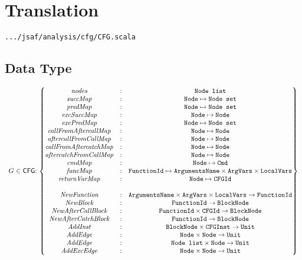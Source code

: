 \section{Translation}
{\inblue\tt .../jsaf/analysis/cfg/CFG.scala}
\subsection{Data Type}
\[
\begin{array}{r@{~}l@{~}l@{}l@{~}l}
G&\in&\CFG & : &
	\begin{Bmatrix}
	\emph{nodes} &:&\Nodelist\\ 
	\emph{succMap} &:&\Node \mapsto\Nodeset\\
	\emph{predMap} &:&\Node \mapsto\Nodeset\\
	\emph{excSuccMap} &:&\Node \mapsto\Node\\
	\emph{excPredMap} &:&\Node \mapsto\Nodeset\\
	\emph{callFromAftercallMap} &:&\Node \mapsto \Node\\
	\emph{aftercallFromCallMap} &:&\Node \mapsto \Node\\
	\emph{callFromAftercatchMap} &:&\Node \mapsto \Node\\
	\emph{aftercatchFromCallMap} &:&\Node \mapsto \Node\\
	\emph{cmdMap} &:& \Node \mapsto \TT{Cmd}\\
	\emph{funcMap} &:& \FunctionId \mapsto \TT{ArgumentsName} \times \ArgVars \times \LocalVars\\
	\emph{returnVarMap} &:& \Node \mapsto \TT{CFGId} \\
	&&\\
	\emph{NewFunction} &:& \TT{ArgumentsName} \times \ArgVars \times \LocalVars \rightarrow \FunctionId\\
	\emph{NewBlock} &:& \FunctionId \rightarrow \TT{BlockNode}\\
	\emph{NewAfterCallBlock} &:& \FunctionId \times \TT{CFGId} \rightarrow \TT{BlockNode}\\
	\emph{NewAfterCatchBlock} &:& \FunctionId \rightarrow \TT{BlockNode}\\
	\emph{AddInst} &:& \TT{BlockNode} \times \TT{CFGInst} \rightarrow \Unit\\
	\emph{AddEdge} &:&\Node \times\Node \rightarrow \Unit\\
	\emph{AddEdge} &:&\Nodelist \times\Node \rightarrow \Unit\\
	\emph{AddExcEdge} &:&\Node \times\Node \rightarrow \Unit\\

\end{Bmatrix}
\end{array}\]
